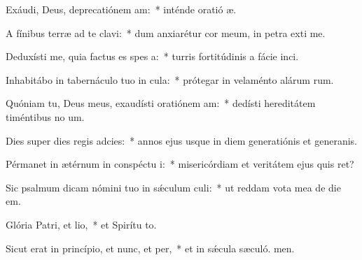 \item Exáudi, Deus, deprecatiónem am:~* inténde oratió æ.
\item A fínibus terræ ad te clavi:~* dum anxiarétur cor meum, in petra exti me.
\item Deduxísti me, quia factus es spes a:~* turris fortitúdinis a fácie inci.
\item Inhabitábo in tabernáculo tuo in cula:~* prótegar in velaménto alárum rum.
\item Quóniam tu, Deus meus, exaudísti oratiónem am:~* dedísti hereditátem timéntibus no um.
\item Dies super dies regis adcies:~* annos ejus usque in diem generatiónis et generanis.
\item Pérmanet in ætérnum in conspéctu i:~* misericórdiam et veritátem ejus quis ret?
\item Sic psalmum dicam nómini tuo in sǽculum culi:~* ut reddam vota mea de die  em.
\item Glória Patri, et lio,~* et Spirítu to.
\item Sicut erat in princípio, et nunc, et per,~* et in sǽcula sæculó. men.
